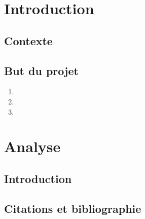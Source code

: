 \documentclass{heig-tb}
\date{\today} %
\begin{document}
\maketitle
\frontmatter
\clearemptydoublepage

\preamble
\authentification

\begin{abstract}

\end{abstract}

\clearemptydoublepage

\tableofcontents

\listoffigures
\listoftables

\printnomenclature

\clearemptydoublepage
{}

\mainmatter
\chapter{Introduction}
\lipsum[3-4]

\section{Contexte}
\lipsum[5]

\section{But du projet}
\lipsum[7]

\begin{enumerate}
\item \lipsum[6][1]
\item \lipsum[6][2]
\item \lipsum[6][3]
\end{enumerate}

\chapter{Analyse}
\section{Introduction}

\lipsum[8]

\section{Citations et bibliographie}
\end{document}
